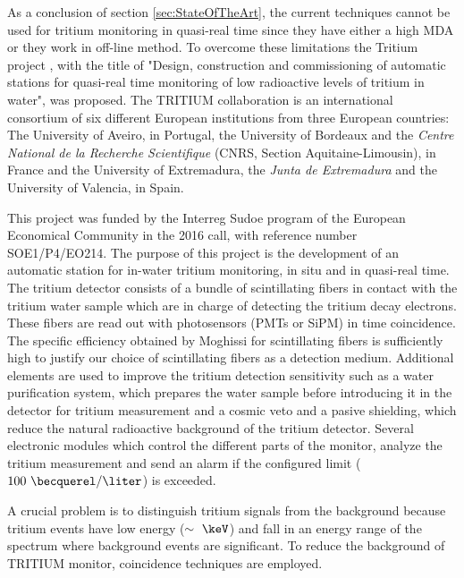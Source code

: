As a conclusion of section \ref{sec:StateOfTheArt}, the current techniques cannot be used for tritium monitoring in quasi-real time since they have either a high MDA or they work in off-line method. To overcome these limitations the Tritium project \cite{TRITIUM}, with the title of "Design, construction and commissioning of automatic stations for quasi-real time monitoring of low radioactive levels of tritium in water", was proposed. The TRITIUM collaboration is an international consortium of six different European institutions from three European countries: The University of Aveiro, in Portugal, the University of Bordeaux and the \textit{Centre National de la Recherche Scientifique} (CNRS, Section Aquitaine-Limousin), in France and the University of Extremadura, the \textit{Junta de Extremadura} and the University of Valencia, in Spain.

This project was funded by the Interreg Sudoe program of the European Economical Community in the 2016 call, with reference number SOE1/P4/EO214. The purpose of this project is the development of an automatic station for in-water tritium monitoring, in situ and in quasi-real time. The tritium detector consists of a bundle of scintillating fibers in contact with the tritium water sample which are in charge of detecting the tritium decay electrons. These fibers are read out with photosensors (PMTs or SiPM) in time coincidence. The specific efficiency obtained by Moghissi for scintillating fibers is sufficiently high to justify our choice of scintillating fibers as a detection medium. Additional elements are used to improve the tritium detection sensitivity such as a water purification system, which prepares the water sample before introducing it in the detector for tritium measurement and a cosmic veto and a pasive shielding, which reduce the natural radioactive background of the tritium detector. Several electronic modules which control the different parts of the monitor, analyze the tritium measurement and send an alarm if the configured limit ($100~\becquerel/\liter$) is exceeded.

A crucial problem is to distinguish tritium signals from the background because tritium events have low energy ($\sim~\keV$) and fall in an energy range of the spectrum where background events are significant. To reduce the background of TRITIUM monitor, coincidence techniques are employed.


